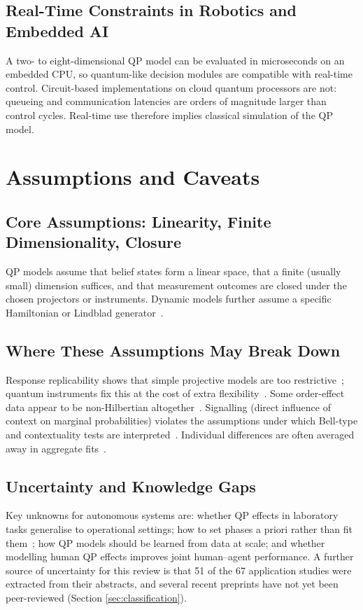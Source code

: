 \documentclass[pdflatex,sn-basic]{sn-jnl}
\begin{document}
\subsection{Real-Time Constraints in Robotics and Embedded AI}\label{sec:realtime}
A two- to eight-dimensional QP model can be evaluated in microseconds on an embedded CPU, so quantum-like decision modules are compatible with real-time control. Circuit-based implementations on cloud quantum processors are not: queueing and communication latencies are orders of magnitude larger than control cycles. Real-time use therefore implies classical simulation of the QP model.


\section{Assumptions and Caveats}\label{sec:assumptions}

\subsection{Core Assumptions: Linearity, Finite Dimensionality, Closure}
QP models assume that belief states form a linear space, that a finite (usually small) dimension suffices, and that measurement outcomes are closed under the chosen projectors or instruments. Dynamic models further assume a specific Hamiltonian or Lindblad generator~\citep{Busemeyer2020,Asano2026}.

\subsection{Where These Assumptions May Break Down}
Response replicability shows that simple projective models are too restrictive~\citep{Khrennikov2014}; quantum instruments fix this at the cost of extra flexibility~\citep{Ozawa2020,Ozawa2021}. Some order-effect data appear to be non-Hilbertian altogether~\citep{Aerts2017b}. Signalling (direct influence of context on marginal probabilities) violates the assumptions under which Bell-type and contextuality tests are interpreted~\citep{Dzhafarov2016a}. Individual differences are often averaged away in aggregate fits~\citep{Epping2023}.

\subsection{Uncertainty and Knowledge Gaps}
Key unknowns for autonomous systems are: whether QP effects in laboratory tasks generalise to operational settings; how to set phases a priori rather than fit them~\citep{Wichert2020}; how QP models should be learned from data at scale; and whether modelling human QP effects improves joint human--agent performance. A further source of uncertainty for this review is that 51 of the 67 application studies were extracted from their abstracts, and several recent preprints have not yet been peer-reviewed (Section \ref{sec:classification}).
\end{document}
